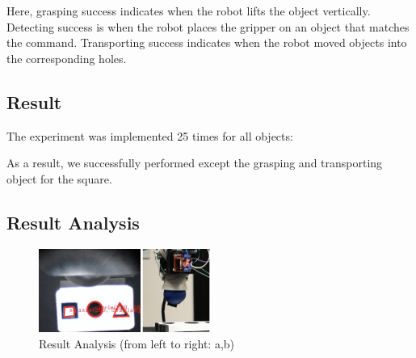 \documentclass[conference,a4paper]{IEEEtran}
\begin{document}
Here, grasping success indicates when the robot lifts the object vertically. Detecting success is when the robot places the gripper on an object that matches the command. Transporting success indicates when the robot moved objects into the corresponding holes. 


\subsection{Result}

The experiment was implemented 25 times for all objects:

    \begin{table}[h]
        \centering
    \end{table}

As a result, we successfully performed except the grasping and transporting object for the square.

\subsection{Result Analysis}

\begin{figure}[h]
\centering
\includegraphics[width=0.5\textwidth]{Analysis.png}
\caption{Result Analysis (from left to right: a,b)}
\label{fig:Analysis}
\end{figure}
\end{document}
